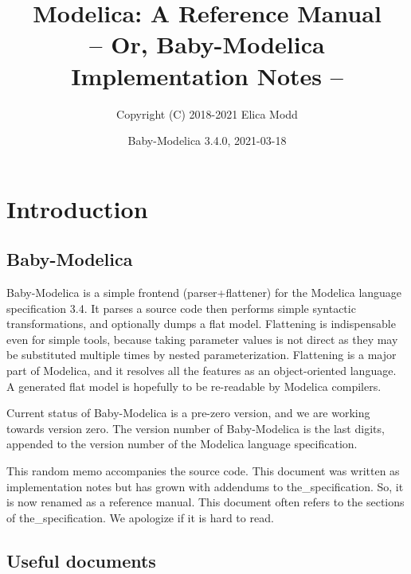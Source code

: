 \documentclass[10pt,b5paper]{article}
\title{\bf{}Modelica: A Reference Manual\\
\normalsize{}-- Or, Baby-Modelica Implementation Notes --}
\author{Copyright (C) 2018-2021 Elica Modd}
\date{Baby-Modelica 3.4.0, 2021-03-18}
\begin{document}
\maketitle

\tableofcontents



\section{Introduction}

\subsection{Baby-Modelica}

Baby-Modelica is a simple frontend (parser+flattener) for the Modelica
language specification 3.4.  It parses a source code then performs
simple syntactic transformations, and optionally dumps a flat model.
Flattening is indispensable even for simple tools, because taking
parameter values is not direct as they may be substituted multiple
times by nested parameterization.  Flattening is a major part of
Modelica, and it resolves all the features as an object-oriented
language.  A generated flat model is hopefully to be re-readable by
Modelica compilers.

Current status of Baby-Modelica is a pre-zero version, and we are
working towards version zero.  The version number of Baby-Modelica is
the last digits, appended to the version number of the Modelica
language specification.

This random memo accompanies the source code.  This document was
written as implementation notes but has grown with addendums to
the_specification.  So, it is now renamed as a reference manual.  This
document often refers to the sections of the_specification.  We
apologize if it is hard to read.


\subsection{Useful documents}
\end{document}
